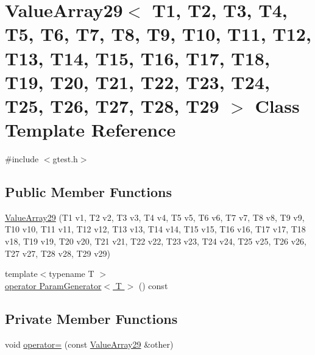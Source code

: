 \hypertarget{classtesting_1_1internal_1_1ValueArray29}{\section{\-Value\-Array29$<$ \-T1, \-T2, \-T3, \-T4, \-T5, \-T6, \-T7, \-T8, \-T9, \-T10, \-T11, \-T12, \-T13, \-T14, \-T15, \-T16, \-T17, \-T18, \-T19, \-T20, \-T21, \-T22, \-T23, \-T24, \-T25, \-T26, \-T27, \-T28, \-T29 $>$ \-Class \-Template \-Reference}
\label{dc/db6/classtesting_1_1internal_1_1ValueArray29}
}


{\ttfamily \#include $<$gtest.\-h$>$}

\subsection*{\-Public \-Member \-Functions}
\begin{DoxyCompactItemize}
\item 
\hyperlink{classtesting_1_1internal_1_1ValueArray29_ab781c24662eadc28c61ee94ea5785408}{\-Value\-Array29} (\-T1 v1, \-T2 v2, \-T3 v3, \-T4 v4, \-T5 v5, \-T6 v6, \-T7 v7, \-T8 v8, \-T9 v9, \-T10 v10, \-T11 v11, \-T12 v12, \-T13 v13, \-T14 v14, \-T15 v15, \-T16 v16, \-T17 v17, \-T18 v18, \-T19 v19, \-T20 v20, \-T21 v21, \-T22 v22, \-T23 v23, \-T24 v24, \-T25 v25, \-T26 v26, \-T27 v27, \-T28 v28, \-T29 v29)
\item 
{\footnotesize template$<$typename T $>$ }\\\hyperlink{classtesting_1_1internal_1_1ValueArray29_a08ef46fa12c9dd8ef6fc630baeea89b7}{operator Param\-Generator$<$ T $>$} () const 
\end{DoxyCompactItemize}
\subsection*{\-Private \-Member \-Functions}
\begin{DoxyCompactItemize}
\item 
void \hyperlink{classtesting_1_1internal_1_1ValueArray29_ad2dd607853e38b74f9b43d791624814f}{operator=} (const \hyperlink{classtesting_1_1internal_1_1ValueArray29}{\-Value\-Array29} \&other)
\end{DoxyCompactItemize}
